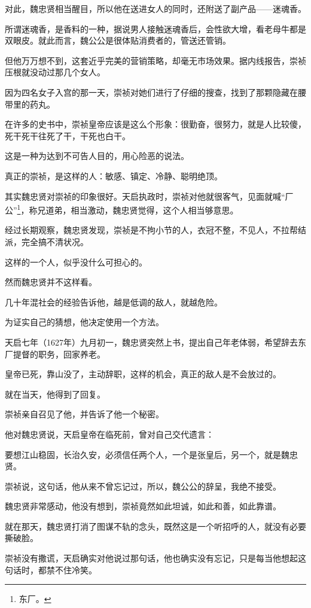 \begin{multicols}{\theparacolNo}
		对此，魏忠贤相当醒目，所以他在送进女人的同时，还附送了副产品——迷魂香。

		所谓迷魂香，是香料的一种，据说男人接触迷魂香后，会性欲大增，看老母牛都是双眼皮。就此而言，魏公公是很体贴消费者的，管送还管销。

		但他万万想不到，这套近乎完美的营销策略，却毫无市场效果。据内线报告，崇祯压根就没动过那几个女人。

		因为四名女子入宫的那一天，崇祯对她们进行了仔细的搜查，找到了那颗隐藏在腰带里的药丸。

		在许多的史书中，崇祯皇帝应该是这么个形象：很勤奋，很努力，就是人比较傻，死干死干往死了干，干死也白干。

		这是一种为达到不可告人目的，用心险恶的说法。

		真正的崇祯，是这样的人：敏感、镇定、冷静、聪明绝顶。

		其实魏忠贤对崇祯的印象很好。天启执政时，崇祯对他就很客气，见面就喊“厂公”\footnote{东厂。}，称兄道弟，相当激动，魏忠贤觉得，这个人相当够意思。

		经过长期观察，魏忠贤发现，崇祯是不拘小节的人，衣冠不整，不见人，不拉帮结派，完全搞不清状况。

		这样的一个人，似乎没什么可担心的。

		然而魏忠贤并不这样看。

		几十年混社会的经验告诉他，越是低调的敌人，就越危险。

		为证实自己的猜想，他决定使用一个方法。

		天启七年（1627年）九月初一，魏忠贤突然上书，提出自己年老体弱，希望辞去东厂提督的职务，回家养老。

		皇帝已死，靠山没了，主动辞职，这样的机会，真正的敌人是不会放过的。

		就在当天，他得到了回复。

		崇祯亲自召见了他，并告诉了他一个秘密。

		他对魏忠贤说，天启皇帝在临死前，曾对自己交代遗言：

		要想江山稳固，长治久安，必须信任两个人，一个是张皇后，另一个，就是魏忠贤。

		崇祯说，这句话，他从来不曾忘记过，所以，魏公公的辞呈，我绝不接受。

		魏忠贤非常感动，他没有想到，崇祯竟然如此坦诚，如此和善，如此靠谱。

		就在那天，魏忠贤打消了图谋不轨的念头，既然这是一个听招呼的人，就没有必要撕破脸。

		崇祯没有撒谎，天启确实对他说过那句话，他也确实没有忘记，只是每当他想起这句话时，都禁不住冷笑。


\end{multicols}
